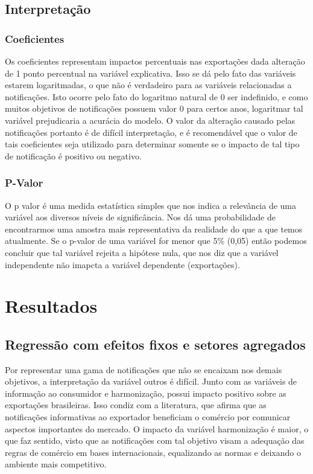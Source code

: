 \documentclass[12pt, a4paper]{article}
\begin{document}
\subsection{Interpretação}

\subsubsection{Coeficientes}

Os coeficientes representam impactos percentuais nas exportações dada alteração de 1 ponto percentual na variável explicativa. Isso se dá pelo fato das variáveis estarem logaritmadas, o que não é verdadeiro para as variáveis relacionadas a notificações. Isto ocorre pelo fato do logaritmo natural de 0 ser indefinido, e como muitos objetivos de notificações possuem valor 0 para certos anos, logaritmar tal variável prejudicaria a acurácia do modelo. O valor da alteração causado pelas notificações portanto é de difícil interpretação, e é recomendável que o valor de tais coeficientes seja utilizado para determinar somente se o impacto de tal tipo de notificação é positivo ou negativo.

\subsubsection{P-Valor}
O p valor é uma medida estatística simples que nos indica a relevância de uma variável aos diversos níveis de significância. Nos dá uma probabilidade de encontrarmos uma amostra mais representativa da realidade do que a que temos atualmente. Se o p-valor de uma variável for menor que 5\% (0,05) então podemos concluir que tal variável rejeita a hipótese nula, que nos diz que a variável independente não imapcta a variável dependente (exportações).


\newpage
\section{Resultados}

\subsection{Regressão com efeitos fixos e setores agregados}



Por representar uma gama de notificações que não se encaixam nos demais objetivos, a interpretação da variável outros é difícil. Junto com as variáveis de informação ao consumidor e harmonização, possui impacto positivo sobre as exportações brasileiras. Isso condiz com a literatura, que afirma que as notificações informativas ao exportador beneficiam o comércio por comunicar aspectos importantes do mercado. O impacto da variável harmonização é maior, o que faz sentido, visto que as notificações com tal objetivo visam a adequação das regras de comércio em bases internacionais, equalizando as normas e deixando o ambiente mais competitivo. 
\end{document}
